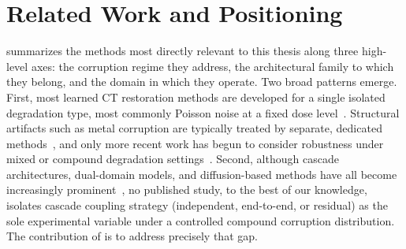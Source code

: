 \section{Related Work and Positioning}
\label{sec:bg_related}

 summarizes the methods most directly relevant to this thesis along three high-level axes: the corruption regime they address, the architectural family to which they belong, and the domain in which they operate. Two broad patterns emerge. First, most learned CT restoration methods are developed for a single isolated degradation type, most commonly Poisson noise at a fixed dose level~\cite{Chen2017, Zhang2017, Komolafe2024, Zhang2023}. Structural artifacts such as metal corruption are typically treated by separate, dedicated methods~\cite{ZhangYu2018, Gjesteby2016}, and only more recent work has begun to consider robustness under mixed or compound degradation settings~\cite{Liang2025}. Second, although cascade architectures, dual-domain models, and diffusion-based methods have all become increasingly prominent~\cite{Schlemper2018, Wang2020, Zhang2022, Song2022, Chung2023, Liu2023DOLCE, DM4CT2025}, no published study, to the best of our knowledge, isolates cascade coupling strategy (independent, end-to-end, or residual) as the sole experimental variable under a controlled compound corruption distribution. The contribution of  is to address precisely that gap.
